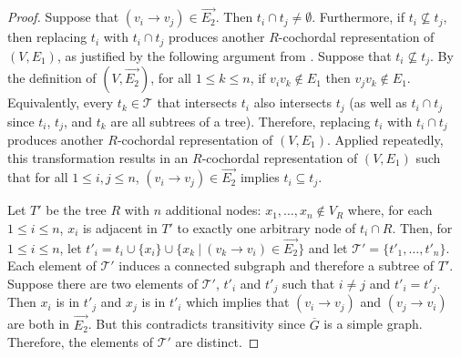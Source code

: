 \documentclass[
final
]{dmtcs-episciences}        \usepackage{graphics, amsthm, amsmath, amssymb, algorithm, algorithmic}
\begin{document}
\begin{proof}
Suppose that 
$(v_i \rightarrow v_j) \in \overrightarrow{E_2}$. Then $t_i \cap t_j \ne \emptyset$. 
Furthermore, if $t_i \not\subseteq t_j$, then
replacing $t_i$ with $t_i \cap t_j$ produces another $R$-cochordal representation of $(V, E_1)$, as justified by the following argument from \cite{gavril2000}.
Suppose that $t_i \not\subseteq t_j$.
By the definition of $(V, \overrightarrow{E_2})$, for all $1 \le k \le n$, if $v_i v_k \notin E_1$ then $v_j v_k \notin E_1$. Equivalently, every $t_k \in \mathcal{T}$ that intersects $t_i$ also intersects $t_j$ (as well as $t_i \cap t_j$ since $t_i$, $t_j$, and $t_k$ are all subtrees of a tree).
Therefore, replacing $t_i$ with $t_i \cap t_j$ produces another $R$-cochordal representation of $(V, E_1)$.
Applied repeatedly, this transformation results in an $R$-cochordal representation of $(V, E_1)$ such that for all $1 \le i,j \le n$, $(v_i \rightarrow v_j) \in \overrightarrow{E_2}$ implies $t_i \subseteq t_j$. 
      
Let $T'$ be the tree $R$ with $n$ additional nodes: $x_1, \ldots, x_n \notin V_R$ where, for each $1 \le i \le n$, $x_i$ is adjacent in $T'$ to exactly one arbitrary node of $t_i \cap R$.
Then, for $1 \le i \le n$, let $t'_i = t_i \cup \{x_i\} \cup \{x_k ~|~ (v_k \rightarrow v_i) \in \overrightarrow{E_2} \}$ and let $\mathcal T' = \{ t'_1, \ldots, t'_n \}$. 
Each element of $\mathcal T'$ induces a connected subgraph and therefore a subtree of $T'$.
Suppose there are two elements of $\mathcal T'$, $t'_i$ and $t'_j$ such that $i \ne j$ and $t'_i = t'_j$. Then $x_i$ is in $t'_j$ and $x_j$ is in $t'_i$ which implies that $(v_i \rightarrow v_j)$ and  $(v_j \rightarrow v_i)$ are both in $ \overrightarrow{E_2}$. But this contradicts transitivity since 
$\overline{G}$ is a simple graph. Therefore,
the elements of $\mathcal T'$ are distinct.


\end{proof}
\end{document}
